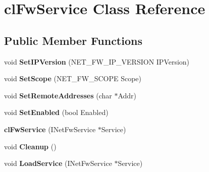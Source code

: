 \hypertarget{classcl_fw_service}{
\section{clFwService Class Reference}
\label{classcl_fw_service}
}
\subsection*{Public Member Functions}
\begin{DoxyCompactItemize}
\item 
\hypertarget{classcl_fw_service_a4bc088c053fe957b202cca8396d190b5}{
void {\bfseries SetIPVersion} (NET\_\-FW\_\-IP\_\-VERSION IPVersion)}
\label{classcl_fw_service_a4bc088c053fe957b202cca8396d190b5}

\item 
\hypertarget{classcl_fw_service_a6981a63ff376312ded644787b8281dc6}{
void {\bfseries SetScope} (NET\_\-FW\_\-SCOPE Scope)}
\label{classcl_fw_service_a6981a63ff376312ded644787b8281dc6}

\item 
\hypertarget{classcl_fw_service_a3a1e4106b210475a0a2934ccf98d4544}{
void {\bfseries SetRemoteAddresses} (char $\ast$Addr)}
\label{classcl_fw_service_a3a1e4106b210475a0a2934ccf98d4544}

\item 
\hypertarget{classcl_fw_service_a9c8acf6fde76eea4e2639801b547a6ea}{
void {\bfseries SetEnabled} (bool Enabled)}
\label{classcl_fw_service_a9c8acf6fde76eea4e2639801b547a6ea}

\item 
\hypertarget{classcl_fw_service_a80eb1434cb27e6f8e859a65486256e0b}{
{\bfseries clFwService} (INetFwService $\ast$Service)}
\label{classcl_fw_service_a80eb1434cb27e6f8e859a65486256e0b}

\item 
\hypertarget{classcl_fw_service_a6bfd13462a2b8db03c53eb1bfc7b944c}{
void {\bfseries Cleanup} ()}
\label{classcl_fw_service_a6bfd13462a2b8db03c53eb1bfc7b944c}

\item 
\hypertarget{classcl_fw_service_a9849e08ebef1d0cf51318b53cbb3883d}{
void {\bfseries LoadService} (INetFwService $\ast$Service)}
\label{classcl_fw_service_a9849e08ebef1d0cf51318b53cbb3883d}

\end{DoxyCompactItemize}
